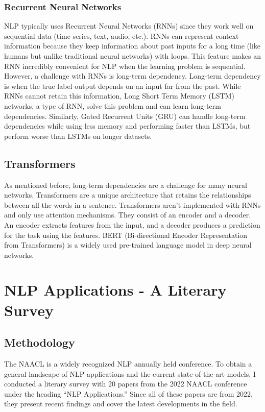 \documentclass[11pt]{article}
\begin{document}


\subsubsection{Recurrent Neural Networks}
NLP typically uses Recurrent Neural Networks (RNNs) since they work well on sequential data (time series, text, audio, etc.). RNNs can represent context information because they keep information about past inputs for a long time (like humans but unlike traditional neural networks) with loops. This feature makes an RNN incredibly convenient for NLP when the learning problem is sequential. However, a challenge with RNNs is long-term dependency. Long-term dependency is when the true label output depends on an input far from the past. While RNNs cannot retain this information, Long Short Term Memory (LSTM) networks, a type of RNN, solve this problem and can learn long-term dependencies. Similarly, Gated Recurrent Units (GRU) can handle long-term dependencies while using less memory and performing faster than LSTMs, but perform worse than LSTMs on longer datasets.

\subsection{Transformers}

As mentioned before, long-term dependencies are a challenge for many neural networks. Transformers are a unique architecture that retains the relationships between all the words in a sentence. Transformers aren’t implemented with RNNs and only use attention mechanisms. They consist of an encoder and a decoder. An encoder extracts features from the input, and a decoder produces a prediction for the task using the features. BERT (Bi-directional Encoder Representation from Transformers) is a widely used pre-trained language model in deep neural networks. 


\section{NLP Applications - A Literary Survey}

\subsection{Methodology}
The NAACL is a widely recognized NLP annually held conference. To obtain a general landscape of NLP applications and the current state-of-the-art models, I conducted a literary survey with 20 papers from the 2022 NAACL conference under the heading “NLP Applications.” Since all of these papers are from 2022, they present recent findings and cover the latest developments in the field. 
\end{document}

